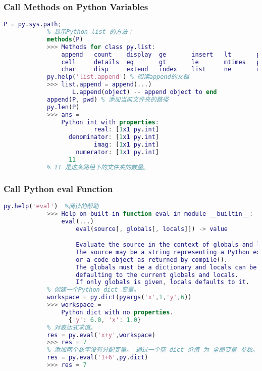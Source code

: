         \subsubsection{Call Methods on Python Variables}
            \begin{lstlisting}[language = Matlab]
            P = py.sys.path;
            % 显示Python list 的方法：
            methods(P)
            >>> Methods for class py.list:
                append   count    display  ge       insert   lt       plus     reverse
                cell     details  eq       gt       le       mtimes   pop      sort
                char     disp     extend   index    list     ne       remove
            py.help('list.append') % 阅读append的文档
            >>> list.append = append(...)
                   L.append(object) -- append object to end
            append(P, pwd) % 添加当前文件夹的路径
            py.len(P)
            >>> ans =
                Python int with properties:
                         real: [1x1 py.int]
                  denominator: [1x1 py.int]
                         imag: [1x1 py.int]
                    numerator: [1x1 py.int]
                  11
            % 11 是这条路经下的文件夹的数量。
            \end{lstlisting}
        \subsubsection{Call Python eval Function}
            \par
            \begin{lstlisting}[language = Matlab]
            py.help('eval')  %阅读的帮助
            >>> Help on built-in function eval in module __builtin__:
                eval(...)
                    eval(source[, globals[, locals]]) -> value

                    Evaluate the source in the context of globals and locals.
                    The source may be a string representing a Python expression
                    or a code object as returned by compile().
                    The globals must be a dictionary and locals can be any mapping,
                    defaulting to the current globals and locals.
                    If only globals is given, locals defaults to it.
            % 创建一个Python dict 变量。
            workspace = py.dict(pyargs('x',1,'y',6))
            >>> workspace =
                Python dict with no properties.
                  {'y': 6.0, 'x': 1.0}
            % 对表达式求值。
            res = py.eval('x+y',workspace)
            >>> res = 7
            % 添加两个数字没有分配变量。 通过一个空 dict 价值 为 全局变量 参数。
            res = py.eval('1+6',py.dict)
            >>> res = 7
            \end{lstlisting}



